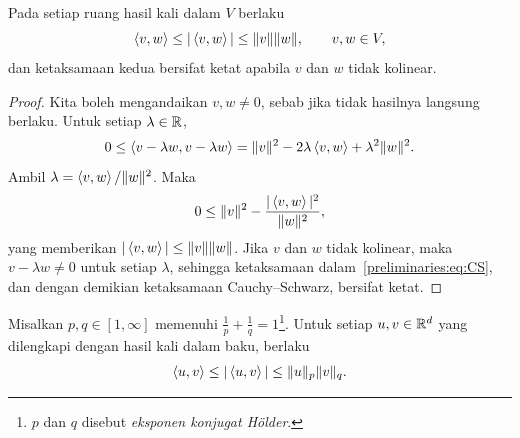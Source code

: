 \begin{cor}
    Pada setiap ruang hasil kali dalam $V$ berlaku
    \begin{equation}
        \left\langle v , w\right\rangle\leq|\left\langle v , w\right\rangle|\leq\|v\|\|w\|,
        \qquad v,w\in V,
    \end{equation}
    dan ketaksamaan kedua bersifat ketat apabila $v$ dan $w$ tidak kolinear.
\end{cor}

\begin{proof}
    Kita boleh mengandaikan $v,w\neq0$, sebab jika tidak hasilnya langsung
    berlaku. Untuk setiap $\lambda\in\mathbb{R}$,
    \begin{equation}\label{preliminaries:eq:CS}
        0\leq\left\langle v-\lambda w , v-\lambda w\right\rangle
        =\|v\|^2-2\lambda\left\langle v , w\right\rangle+\lambda^2\|w\|^2.
    \end{equation}
    Ambil $\lambda=\left\langle v , w\right\rangle/\|w\|^2$. Maka
    \begin{equation}
        0\leq\|v\|^2-\frac{|\left\langle v , w\right\rangle|^2}{\|w\|^2},
    \end{equation}
    yang memberikan $|\left\langle v , w\right\rangle|\leq\|v\|\|w\|$. Jika $v$ dan $w$
    tidak kolinear, maka $v-\lambda w\neq0$ untuk setiap $\lambda$, sehingga
    ketaksamaan dalam~\eqref{preliminaries:eq:CS}, dan dengan demikian
    ketaksamaan Cauchy--Schwarz, bersifat ketat.
\end{proof}


\begin{theorem}[Hölder]
    Misalkan $p,q\in[1,\infty]$ memenuhi
    $\frac1p+\frac1q=1$\footnote{$p$ dan $q$ disebut \emph{eksponen konjugat
    Hölder}.}. Untuk setiap $u,v\in\mathbb{R}^d$ yang dilengkapi dengan hasil kali dalam
    baku, berlaku
    \begin{equation}
        \left\langle u , v\right\rangle\leq|\left\langle u , v\right\rangle|\leq\|u\|_p\|v\|_q.
    \end{equation}
\end{theorem}

